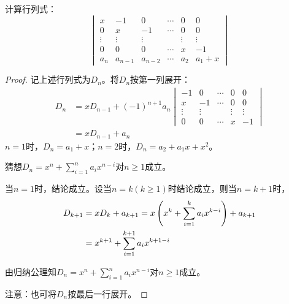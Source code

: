 \begin{problem}
计算行列式：
\begin{equation*}
    \begin{vmatrix}
        x      & -1      & 0       & \cdots & 0      & 0      \\
        0      & x       & -1      & \cdots & 0      & 0      \\
        \vdots & \vdots  & \vdots  &        & \vdots & \vdots \\
        0      & 0       & 0       & \cdots & x      & -1     \\
        a_n    & a_{n-1} & a_{n-2} & \cdots & a_2    & a_1+x
    \end{vmatrix}
\end{equation*}
\end{problem}
\begin{proof}
    记上述行列式为\(D_n\)。将\(D_n\)按第一列展开：
    \begin{align*}
        D_n & =xD_{n-1}+(-1)^{n+1}a_n
        \begin{vmatrix}
            -1     & 0      & \cdots & 0      & 0      \\
            x      & -1     & \cdots & 0      & 0      \\
            \vdots & \vdots &        & \vdots & \vdots \\
            0      & 0      & \cdots & x      & -1
        \end{vmatrix} \\
            & =xD_{n-1}+a_n
    \end{align*}
    \(n=1\)时，\(D_n=a_1+x\)；\(n=2\)时，\(D_n=a_2+a_1x+x^2\)。

    猜想\(D_n=x^n+\sum_{i=1}^{n}a_ix^{n-i}\)对\(n\geq1\)成立。

    当\(n=1\)时，结论成立。设当\(n=k\)\((k\geq1)\)时结论成立，则当\(n=k+1\)时，
    \begin{align*}
        D_{k+1} & =xD_k+a_{k+1}=x\left( x^k+\sum_{i=1}^{k}a_ix^{k-i} \right)+a_{k+1} \\
                & =x^{k+1}+\sum_{i=1}^{k+1}a_ix^{k+1-i}
    \end{align*}

    由归纳公理知\(D_n=x^n+\sum_{i=1}^{n}a_ix^{n-i}\)对\(n\geq1\)成立。

    注意：也可将\(D_n\)按最后一行展开。
\end{proof}

